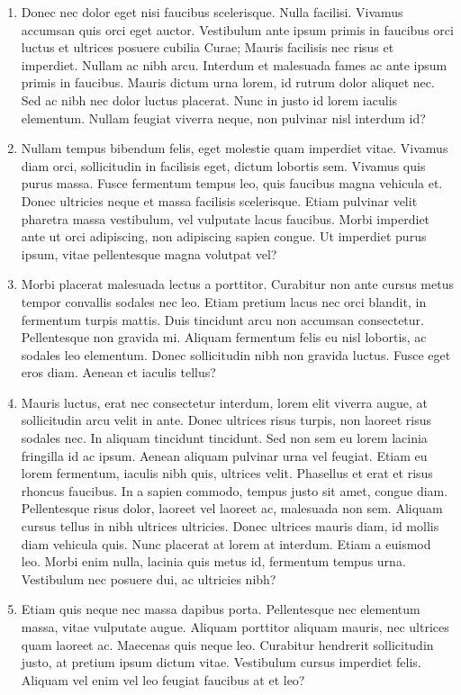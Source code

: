 \begin{enumerate}[Q1.]
\item Donec nec dolor eget nisi faucibus scelerisque. Nulla facilisi. Vivamus accumsan quis orci eget auctor. Vestibulum ante ipsum primis in faucibus orci luctus et ultrices posuere cubilia Curae; Mauris facilisis nec risus et imperdiet. Nullam ac nibh arcu. Interdum et malesuada fames ac ante ipsum primis in faucibus. Mauris dictum urna lorem, id rutrum dolor aliquet nec. Sed ac nibh nec dolor luctus placerat. Nunc in justo id lorem iaculis elementum. Nullam feugiat viverra neque, non pulvinar nisl interdum id?

\item Nullam tempus bibendum felis, eget molestie quam imperdiet vitae. Vivamus diam orci, sollicitudin in facilisis eget, dictum lobortis sem. Vivamus quis purus massa. Fusce fermentum tempus leo, quis faucibus magna vehicula et. Donec ultricies neque et massa facilisis scelerisque. Etiam pulvinar velit pharetra massa vestibulum, vel vulputate lacus faucibus. Morbi imperdiet ante ut orci adipiscing, non adipiscing sapien congue. Ut imperdiet purus ipsum, vitae pellentesque magna volutpat vel?

\item Morbi placerat malesuada lectus a porttitor. Curabitur non ante cursus metus tempor convallis sodales nec leo. Etiam pretium lacus nec orci blandit, in fermentum turpis mattis. Duis tincidunt arcu non accumsan consectetur. Pellentesque non gravida mi. Aliquam fermentum felis eu nisl lobortis, ac sodales leo elementum. Donec sollicitudin nibh non gravida luctus. Fusce eget eros diam. Aenean et iaculis tellus?

\item Mauris luctus, erat nec consectetur interdum, lorem elit viverra augue, at sollicitudin arcu velit in ante. Donec ultrices risus turpis, non laoreet risus sodales nec. In aliquam tincidunt tincidunt. Sed non sem eu lorem lacinia fringilla id ac ipsum. Aenean aliquam pulvinar urna vel feugiat. Etiam eu lorem fermentum, iaculis nibh quis, ultrices velit. Phasellus et erat et risus rhoncus faucibus. In a sapien commodo, tempus justo sit amet, congue diam. Pellentesque risus dolor, laoreet vel laoreet ac, malesuada non sem. Aliquam cursus tellus in nibh ultrices ultricies. Donec ultrices mauris diam, id mollis diam vehicula quis. Nunc placerat at lorem at interdum. Etiam a euismod leo. Morbi enim nulla, lacinia quis metus id, fermentum tempus urna. Vestibulum nec posuere dui, ac ultricies nibh?

\item Etiam quis neque nec massa dapibus porta. Pellentesque nec elementum massa, vitae vulputate augue. Aliquam porttitor aliquam mauris, nec ultrices quam laoreet ac. Maecenas quis neque leo. Curabitur hendrerit sollicitudin justo, at pretium ipsum dictum vitae. Vestibulum cursus imperdiet felis. Aliquam vel enim vel leo feugiat faucibus at et leo?
\end{enumerate}